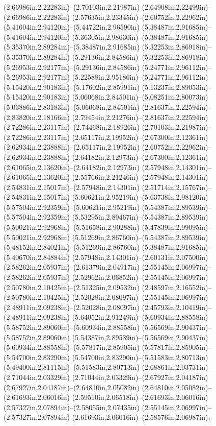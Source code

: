 (2.66986in,2.22283in)--(2.70103in,2.21987in) (2.64908in,2.22499in)--(2.66986in,2.22283in) (2.57635in,2.23345in)--(2.60752in,2.22962in) (5.41604in,2.94120in)--(5.44722in,2.96590in) (5.38487in,2.91685in)--(5.41604in,2.94120in) (5.36305in,2.98630in)--(5.38487in,2.91685in) (5.35370in,2.89284in)--(5.38487in,2.91685in) (5.32253in,2.86918in)--(5.35370in,2.89284in) (5.29136in,2.84586in)--(5.32253in,2.86918in) (5.26953in,2.92177in)--(5.29136in,2.84586in) (5.24771in,2.96112in)--(5.26953in,2.92177in) (5.22588in,2.95186in)--(5.24771in,2.96112in) (5.15420in,2.90183in)--(5.17602in,2.85991in) (5.13237in,2.89053in)--(5.15420in,2.90183in) (5.06068in,2.84501in)--(5.08251in,2.80073in) (5.03886in,2.83183in)--(5.06068in,2.84501in) (2.81637in,2.22594in)--(2.83820in,2.18166in) (2.79454in,2.21276in)--(2.81637in,2.22594in) (2.72286in,2.23117in)--(2.74468in,2.18926in) (2.70103in,2.21987in)--(2.72286in,2.23117in) (2.65117in,2.19952in)--(2.67300in,2.12361in) (2.62934in,2.23888in)--(2.65117in,2.19952in) (2.60752in,2.22962in)--(2.62934in,2.23888in) (2.64182in,2.12973in)--(2.67300in,2.12361in) (2.61065in,2.13620in)--(2.64182in,2.12973in) (2.57948in,2.14301in)--(2.61065in,2.13620in) (2.55766in,2.21246in)--(2.57948in,2.14301in) (2.54831in,2.15017in)--(2.57948in,2.14301in) (2.51714in,2.15767in)--(2.54831in,2.15017in) (5.60621in,2.95219in)--(5.63738in,2.98120in) (5.57504in,2.92359in)--(5.60621in,2.95219in) (5.54387in,2.89539in)--(5.57504in,2.92359in) (5.53295in,2.89467in)--(5.54387in,2.89539in) (5.50021in,2.92968in)--(5.51658in,2.90288in) (5.47839in,2.99095in)--(5.50021in,2.92968in) (5.51269in,2.86760in)--(5.54387in,2.89539in) (5.48152in,2.84021in)--(5.51269in,2.86760in) (5.38487in,2.91685in)--(5.40670in,2.84884in) (2.57948in,2.14301in)--(2.60131in,2.07500in) (2.58262in,2.05937in)--(2.61379in,2.04917in) (2.55145in,2.06997in)--(2.58262in,2.05937in) (2.52962in,2.06852in)--(2.55145in,2.06997in) (2.50780in,2.10425in)--(2.51325in,2.09532in) (2.48597in,2.16552in)--(2.50780in,2.10425in) (2.52028in,2.08097in)--(2.55145in,2.06997in) (2.48911in,2.09238in)--(2.52028in,2.08097in) (2.45793in,2.10419in)--(2.48911in,2.09238in) (5.64052in,2.91249in)--(5.60934in,2.88558in) (5.58752in,2.89060in)--(5.60934in,2.88558in) (5.56569in,2.90437in)--(5.58752in,2.89060in) (5.54387in,2.89539in)--(5.56569in,2.90437in) (5.60934in,2.88558in)--(5.57817in,2.85905in) (5.57817in,2.85905in)--(5.54700in,2.83290in) (5.54700in,2.83290in)--(5.51583in,2.80713in) (5.49400in,2.81115in)--(5.51583in,2.80713in) (2.68861in,2.03731in)--(2.71044in,2.03329in) (2.71044in,2.03329in)--(2.67927in,2.04187in) (2.67927in,2.04187in)--(2.64810in,2.05082in) (2.64810in,2.05082in)--(2.61693in,2.06016in) (2.59510in,2.06518in)--(2.61693in,2.06016in) (2.57327in,2.07894in)--(2.58055in,2.07435in) (2.55145in,2.06997in)--(2.57327in,2.07894in) (2.61693in,2.06016in)--(2.58576in,2.06987in);
